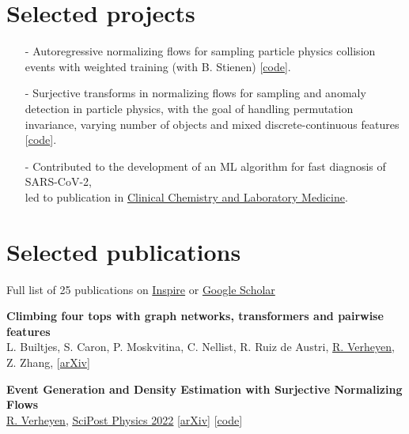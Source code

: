 \documentclass[a4paper,12pt]{article}
\begin{document}
\section{Selected projects}
\begin{itemize}[nosep,after=\strut, leftmargin=1em]
    \item[-] Autoregressive normalizing flows for sampling particle physics collision events with weighted training (with B. Stienen) [\href{https://github.com/rbvh/PhaseSpaceAutoregressiveFlow}{code}].
    \item[-] Surjective transforms in normalizing flows for sampling and anomaly detection in particle physics, with the goal of handling permutation invariance, varying number of objects and mixed discrete-continuous features [\href{https://github.com/rbvh/surflows}{code}].
    \item[-] Contributed to the development of an ML algorithm for fast diagnosis of SARS-CoV-2, \\ led to publication in \href{https://www.degruyter.com/document/doi/10.1515/cclm-2020-0593/html}{Clinical Chemistry and Laboratory Medicine}.
\end{itemize}



\section{Selected publications}
Full list of 25 publications on \href{https://inspirehep.net/authors/1777870?ui-citation-summary=true}{Inspire} or \href{https://scholar.google.com/citations?user=MRTAm7UAAAAJ&hl=en&oi=ao}{Google Scholar}

\textbf{Climbing four tops with graph networks, transformers and pairwise features} \\
L. Builtjes, S. Caron, P. Moskvitina, C. Nellist, R. Ruiz de Austri, \underline{R. Verheyen}, Z. Zhang,
[\href{https://arxiv.org/pdf/2211.05143.pdf}{arXiv}]

\textbf{Event Generation and Density Estimation with Surjective Normalizing Flows} \\
\underline{R. Verheyen}, 
\href{https://scipost.org/10.21468/SciPostPhys.13.3.047}{\underline{SciPost Physics 2022}} [\href{https://arxiv.org/abs/2205.01697}{arXiv}] [\href{https://github.com/rbvh/surflows}{code}]
\end{document}
